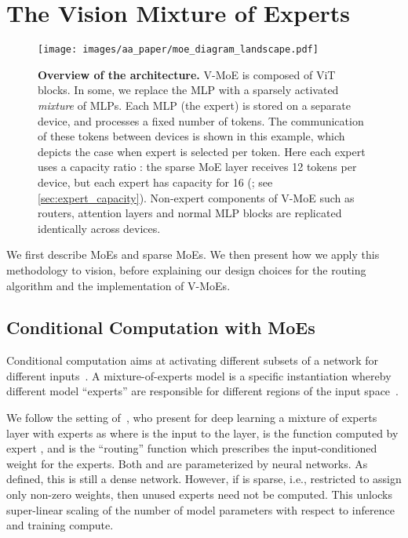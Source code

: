 \documentclass{article}
\newcommand{\abbv}{{V-MoE}}
\begin{document}
 \section{The Vision Mixture of Experts}
\label{sec:model}

\begin{figure}
\centering
\texttt{[image: images/aa\_paper/moe\_diagram\_landscape.pdf]}
\caption{\textbf{Overview of the architecture.} \abbv{} is composed of  ViT blocks. In some, we replace the MLP with a sparsely activated \textit{mixture} of MLPs. Each MLP (the expert) is stored on a separate device, and processes a fixed number of tokens. The communication of these tokens between devices is shown in this example, which depicts the case when  expert is selected per token. 
Here each expert uses a capacity ratio : the sparse MoE layer receives 12 tokens per device, but each expert has capacity for 16 (; see \cref{sec:expert_capacity}).
Non-expert components of \abbv{} such as routers, attention layers and normal MLP blocks are replicated identically across devices.}
\label{im:v_moe_architecture}
\end{figure}

We first describe MoEs and sparse MoEs. We then present how we apply this methodology to vision, 
before explaining our design choices for the routing algorithm and the implementation of \abbv{}s.

\subsection{Conditional Computation with MoEs}
Conditional computation aims at activating different subsets of a network for different inputs~\cite{bengio2013deep}.
A mixture-of-experts model is a specific instantiation whereby different model ``experts'' are responsible for different regions of the input space~\cite{jacobs1991adaptive}.

We follow the setting of~\cite{shazeer2017outrageously}, who present for deep learning a mixture of experts layer with  experts as  where  is the input to the layer, 
 is the function computed by expert , 
and  is the ``routing'' function which prescribes the input-conditioned weight for the experts.
Both  and  are parameterized by neural networks.
As defined, this is still a dense network.  
However, if  is sparse, i.e., restricted to assign only  non-zero weights, then unused experts need not be computed.
This unlocks super-linear scaling of the number of model parameters with respect to inference and training compute.
\end{document}
